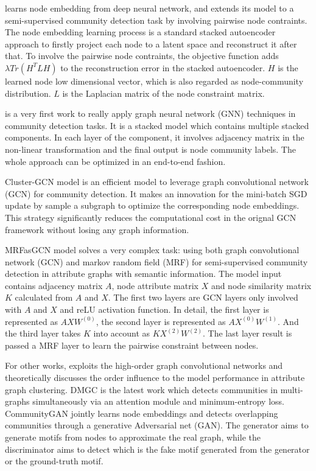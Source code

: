 \cite{yang2016modularity} learns node embedding from deep neural network, and extends its model to a semi-supervised community detection task by involving pairwise node contraints. The node embedding learning process is a standard stacked autoencoder approach to firstly project each node to a latent space and reconstruct it after that. To involve the pairwise node contraints, the objective function adds $\lambda Tr(H^TLH)$ to the reconstruction error in the stacked autoencoder. $H$ is the learned node low dimensional vector, which is also regarded as node-community distribution. $L$ is the Laplacian matrix of the node constraint matrix. 

\cite{bruna2017community} is a very first work to really apply graph neural network (GNN) techniques in community detection tasks. It is a stacked model which contains multiple stacked components. In each layer of the component, it involves adjacency matrix in the non-linear transformation and the final output is node community labels. The whole approach can be optimized in an end-to-end fashion. 

Cluster-GCN model \cite{chiang2019cluster} is an efficient model to leverage graph convolutional network (GCN) for community detection. It makes an innovation for the mini-batch SGD update by sample a subgraph to optimize the corresponding node embeddings. This strategy significantly reduces the computational cost in the orignal GCN framework without losing any graph information. 

MRFasGCN  model \cite{jin2019graph} solves a very complex task: using both graph convolutional network (GCN) and markov random field (MRF) for semi-supervised community detection in attribute graphs with semantic information. The model input contains adjacency matrix $A$, node attribute matrix $X$ and node similarity matrix $K$ calculated from $A$ and $X$. The first two layers are GCN layers only involved with $A$ and $X$ and reLU activation function. In detail, the first layer is represented as $AXW^{(0)}$, the second layer is represented as $AX^{(0)}W^{(1)}$.  And the third layer takes $K$ into account as $KX^{(2)}W^{(2)}$. The last layer result is passed a MRF layer to learn the pairwise constraint between nodes.  

For other works, \cite{zhang2019attributed} exploits the high-order graph convolutional networks and theoretically discusses the order influence to the model performance in attribute graph clustering. DMGC \cite{luo2020deep} is the latest work which detects communities in multi-graphs simultaneously via an attention module and minimum-entropy loss.  CommunityGAN \cite{jia2019communitygan} jointly learns node embeddings and detects overlapping communities through a generative Adversarial net (GAN). The generator aims to generate motifs from nodes to approximate the real graph, while the discriminator aims to detect which is the fake motif generated from the generator or the ground-truth motif.

